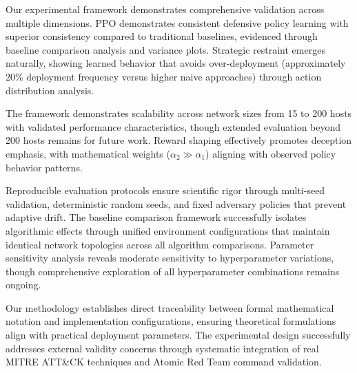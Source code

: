 \documentclass[12pt,oneside]{article}
\begin{document}
Our experimental framework demonstrates comprehensive validation across multiple dimensions. PPO demonstrates consistent defensive policy learning with superior consistency compared to traditional baselines, evidenced through baseline comparison analysis and variance plots. Strategic restraint emerges naturally, showing learned behavior that avoids over-deployment (approximately 20\% deployment frequency versus higher naive approaches) through action distribution analysis.

The framework demonstrates scalability across network sizes from 15 to 200 hosts with validated performance characteristics, though extended evaluation beyond 200 hosts remains for future work. Reward shaping effectively promotes deception emphasis, with mathematical weights ($\alpha_2 \gg \alpha_1$) aligning with observed policy behavior patterns. 

Reproducible evaluation protocols ensure scientific rigor through multi-seed validation, deterministic random seeds, and fixed adversary policies that prevent adaptive drift. The baseline comparison framework successfully isolates algorithmic effects through unified environment configurations that maintain identical network topologies across all algorithm comparisons. Parameter sensitivity analysis reveals moderate sensitivity to hyperparameter variations, though comprehensive exploration of all hyperparameter combinations remains ongoing.

Our methodology establishes direct traceability between formal mathematical notation and implementation configurations, ensuring theoretical formulations align with practical deployment parameters. The experimental design successfully addresses external validity concerns through systematic integration of real MITRE ATT\&CK techniques and Atomic Red Team command validation.
\end{document}
